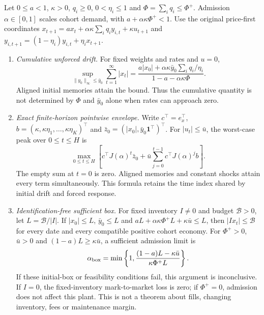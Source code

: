 \begin{proposition}\label{p2:prop:driftguard}
Let $0\le a<1$, $\kappa>0$, $q_i\ge0$, $0<\eta_i\le1$ and $\Phi=\sum_iq_i\le\Phi^+$. Admission $\alpha\in[0,1]$ scales cohort demand, with $a+\alpha\kappa\Phi^+<1$. Use the original price-first coordinates $x_{t+1}=ax_t+\alpha\kappa\sum_iq_iy_{i,t}+\kappa u_{t+1}$ and $y_{i,t+1}=(1-\eta_i)y_{i,t}+\eta_ix_{t+1}$.
\begin{enumerate}[label=(\roman*)]
\item \emph{Cumulative unforced drift.} For fixed weights and rates and $u=0$,
\begin{equation}\label{p2:eq:driftenv}
\sup_{\|y_0\|_\infty\le\bar y_0}\sum_{t=1}^\infty|x_t|
=\frac{a|x_0|+\alpha\kappa\bar y_0\sum_iq_i/\eta_i}{1-a-\alpha\kappa\Phi}.
\end{equation}
Aligned initial memories attain the bound. Thus the cumulative quantity is not determined by $\Phi$ and $\bar y_0$ alone when rates can approach zero.
\item \emph{Exact finite-horizon pointwise envelope.} Write $c^\top=e_x^\top$, $b=(\kappa,\kappa\eta_1,\ldots,\kappa\eta_K)^\top$ and $\bar z_0=(|x_0|,\bar y_0\mathbf1^\top)^\top$. For $|u_t|\le\bar u$, the worst-case peak over $0\le t\le H$ is
\begin{equation}\label{p2:eq:driftpeak}
\max_{0\le t\le H}\left[c^\top J(\alpha)^t\bar z_0+\bar u\sum_{j=0}^{t-1}c^\top J(\alpha)^jb\right].
\end{equation}
The empty sum at $t=0$ is zero. Aligned memories and constant shocks attain every term simultaneously. This formula retains the time index shared by initial drift and forced response.
\item \emph{Identification-free sufficient box.} For fixed inventory $I\ne0$ and budget $\mathcal B>0$, let $L=\mathcal B/|I|$. If $|x_0|\le L$, $\bar y_0\le L$ and $aL+\alpha\kappa\Phi^+L+\kappa\bar u\le L$, then $|I x_t|\le\mathcal B$ for every date and every compatible positive cohort economy. For $\Phi^+>0$, $\bar u>0$ and $(1-a)L\ge\kappa\bar u$, a sufficient admission limit is
\begin{equation}\label{p2:eq:alphabox}
\alpha_{\rm box}=\min\left\{1,\frac{(1-a)L-\kappa\bar u}{\kappa\Phi^+L}\right\}.
\end{equation}
If these initial-box or feasibility conditions fail, this argument is inconclusive. If $I=0$, the fixed-inventory mark-to-market loss is zero; if $\Phi^+=0$, admission does not affect this plant. This is not a theorem about fills, changing inventory, fees or maintenance margin.
\end{enumerate}
\end{proposition}

